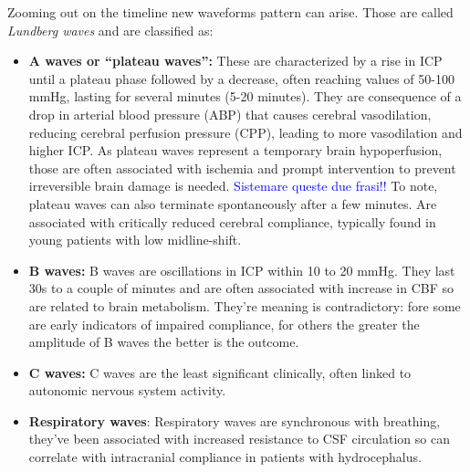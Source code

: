 Zooming out on the timeline new waveforms pattern can arise. Those are called \textit{Lundberg waves} and are classified as: 
\begin{itemize}
    \item \textbf{A waves or “plateau waves”:}
    These are characterized by a rise in ICP until a plateau phase followed by a decrease, often reaching values of 50-100 mmHg, lasting for several minutes (5-20 minutes).
    They are consequence of a drop in arterial blood pressure (ABP) that causes cerebral vasodilation, reducing cerebral perfusion pressure (CPP), leading to more vasodilation and higher ICP. As plateau waves represent a temporary brain hypoperfusion, those are often associated with ischemia and prompt intervention to prevent irreversible brain damage is needed. \textcolor{blue}{Sistemare queste due frasi!!} To note, plateau waves can also terminate spontaneously after a few minutes. Are associated with critically reduced cerebral compliance, typically found in young patients with low midline-shift.

    \item \textbf{B waves:} B waves are oscillations in ICP within 10 to 20 mmHg. They last 30s to a couple of minutes and are often associated with increase in CBF so are related to  brain metabolism. They're meaning is contradictory: fore some  are early indicators of impaired  compliance, for others the greater the amplitude of B waves the better is the outcome\cite{cuccioliniIntracranialPressureClinicians2023a}.
 
    \item \textbf{C waves:} C waves are the least significant clinically, often linked to autonomic nervous system activity. 
  
    \item \textbf{Respiratory waves}: Respiratory waves are synchronous with breathing, they've been associated with increased resistance to CSF circulation so can correlate with intracranial compliance in patients with hydrocephalus.\\

\end{itemize}

